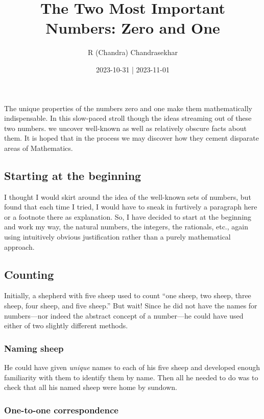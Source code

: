 \documentclass[
  a4paper,
]{article}
\title{The Two Most Important Numbers: Zero and One}
\author{R (Chandra) Chandrasekhar}
\date{2023-10-31 | 2023-11-01}
\begin{document}
\maketitle

\thispagestyle{empty}


The unique properties of the numbers zero and one make them
mathematically indispensable. In this slow-paced stroll though the ideas
streaming out of these two numbers. we uncover well-known as well as
relatively obscure facts about them. It is hoped that in the process we
may discover how they cement disparate areas of Mathematics.

\hypertarget{starting-at-the-beginning}{%
\subsection{Starting at the beginning}\label{starting-at-the-beginning}}

I thought I would skirt around the idea of the well-known sets of
numbers, but found that each time I tried, I would have to sneak in
furtively a paragraph here or a footnote there as explanation. So, I
have decided to start at the beginning and work my way, the natural
numbers, the integers, the rationals, etc., again using intuitively
obvious justification rather than a purely mathematical approach.

\hypertarget{counting}{%
\subsection{Counting}\label{counting}}

Initially, a shepherd with five sheep used to count ``one sheep, two
sheep, three sheep, four sheep, and five sheep.'' But wait! Since he did
not have the names for numbers---nor indeed the abstract concept of a
number---he could have used either of two slightly different methods.

\hypertarget{naming-sheep}{%
\subsubsection{Naming sheep}\label{naming-sheep}}

He could have given \emph{unique} names to each of his five sheep and
developed enough familiarity with them to identify them by name. Then
all he needed to do was to check that all his named sheep were home by
sundown.

\hypertarget{one-to-one-correspondence}{%
\subsubsection{One-to-one
correspondence}\label{one-to-one-correspondence}}
\end{document}
